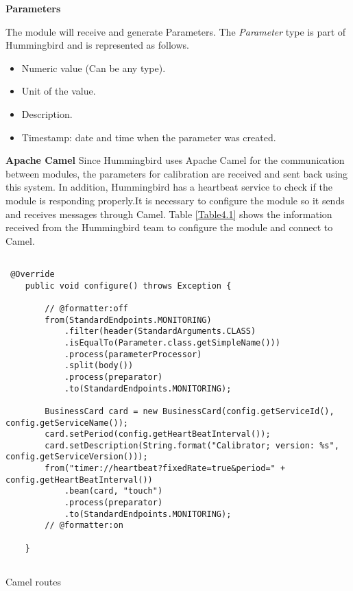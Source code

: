 \textbf{Parameters}

The module will receive and generate Parameters. The \emph{Parameter} type is part of Hummingbird and is represented as follows.

\begin{itemize}
\item Numeric value (Can be any type).
\item Unit of the value.
\item Description.
\item Timestamp: date and time when the parameter was created.

\end{itemize}


\textbf{Apache Camel}\citep{Camel}
Since Hummingbird uses Apache Camel for the communication between modules, the parameters for calibration are received and sent back using this system. In addition, Hummingbird has a heartbeat service to check if the module is responding properly.It is necessary to configure the module so it sends and receives messages through Camel.
Table \ref{Table4.1} shows the information received from the Hummingbird team to configure the module and connect to Camel.

\begin{table}[H]
\lstset{language=Java}
\begin{lstlisting}

 @Override
    public void configure() throws Exception {

        // @formatter:off
        from(StandardEndpoints.MONITORING)
            .filter(header(StandardArguments.CLASS)
            .isEqualTo(Parameter.class.getSimpleName()))
            .process(parameterProcessor)
            .split(body())
            .process(preparator)
            .to(StandardEndpoints.MONITORING);
        
        BusinessCard card = new BusinessCard(config.getServiceId(), config.getServiceName());
        card.setPeriod(config.getHeartBeatInterval());
        card.setDescription(String.format("Calibrator; version: %s", config.getServiceVersion()));
        from("timer://heartbeat?fixedRate=true&period=" + config.getHeartBeatInterval())
            .bean(card, "touch")
            .process(preparator)
            .to(StandardEndpoints.MONITORING);
        // @formatter:on

    }


\end{lstlisting}
\caption{Camel routes}
\label{Table4.1}
\end{table}




